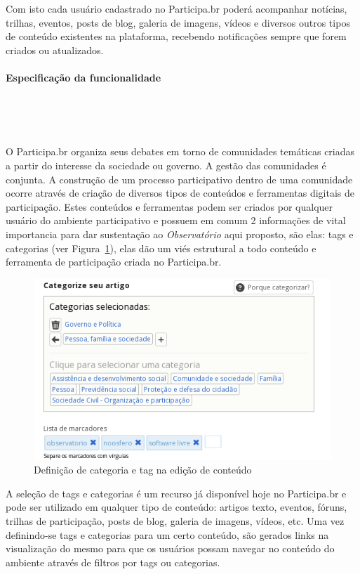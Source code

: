 \documentclass[12pt]{article}
\begin{document}
Com isto cada usuário cadastrado no Participa.br poderá acompanhar
notícias, trilhas, eventos, posts de blog, galeria de imagens, vídeos e
diversos outros tipos de conteúdo existentes na plataforma, recebendo
notificações sempre que forem criados ou atualizados.

\paragraph{Especificação da funcionalidade} \

\

O Participa.br organiza seus debates em torno de comunidades temáticas criadas
a partir do interesse da sociedade ou governo. A gestão das comunidades é
conjunta. A construção de um processo participativo dentro de uma comunidade
ocorre através de criação de diversos tipos de conteúdos e ferramentas
digitais de participação. Estes conteúdos e ferramentas podem ser criados por
qualquer usuário do ambiente participativo e possuem em comum 2 informações de
vital importancia para dar sustentação ao {\it Observatório} aqui proposto, são
elas: tags e categorias (ver Figura~\ref{categorias-tags}), elas dão um viés
estrutural a todo conteúdo e ferramenta de participação criada no
Participa.br.

\begin{figure}[h!]
\center
\includegraphics[scale=0.6]{categorias-tags.png}
\caption{Definição de categoria e tag na edição de conteúdo}
\label{categorias-tags}
\end{figure}

A seleção de tags e categorias é um recurso já disponível hoje no Participa.br
e pode ser utilizado em qualquer tipo de conteúdo: artigos texto,
eventos, fóruns, trilhas de participação, posts de blog, galeria de imagens,
vídeos, etc. Uma vez definindo-se tags e categorias para um certo conteúdo, são
gerados links na visualização do mesmo para que os usuários possam navegar no
conteúdo do ambiente através de filtros por tags ou categorias.
\end{document}
